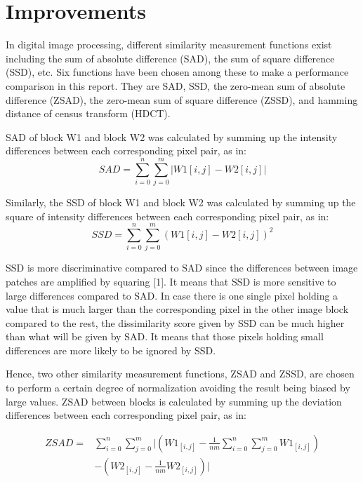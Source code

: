\documentclass[conference]{IEEEtran}
\begin{document}
\section{Improvements}
In digital image processing, different similarity measurement functions exist including the sum of absolute difference (SAD), the sum of square difference (SSD), etc. Six functions have been chosen among these to make a performance comparison in this report. They are SAD, SSD, the zero-mean sum of absolute difference (ZSAD), the zero-mean sum of square difference (ZSSD), and hamming distance of census transform (HDCT). 

SAD of block W1 and block W2 was calculated by summing up the intensity differences between each corresponding pixel pair, as in:
\begin{equation*}
    SAD=\sum^{n}_{i=0}\sum^{m}_{j=0}|W1[i,j]-W2[i,j]|
\end{equation*}

Similarly, the SSD of block W1 and block W2 was calculated by summing up the square of intensity differences between each corresponding pixel pair, as in:
\begin{equation*}
    SSD=\sum^{n}_{i=0}\sum^{m}_{j=0}(W1[i,j]-W2[i,j])^2
\end{equation*}

SSD is more discriminative compared to SAD since the differences between image patches are amplified by squaring [1]. It means that SSD is more sensitive to large differences compared to SAD. In case there is one single pixel holding a value that is much larger than the corresponding pixel in the other image block compared to the rest, the dissimilarity score given by SSD can be much higher than what will be given by SAD. It means that those pixels holding small differences are more likely to be ignored by SSD.

Hence, two other similarity measurement functions, ZSAD and ZSSD, are chosen to perform a certain degree of normalization avoiding the result being biased by large values. ZSAD between blocks is calculated by summing up the deviation differences between each corresponding pixel pair, as in:

\begin{equation*}
    \begin{aligned}
        ZSAD= {} & \sum^{n}_{i=0}\sum^{m}_{j=0}|(W1_{[i,j]}-\frac{1}{nm}\sum^{n}_{i=0}\sum^{m}_{j=0}W1_{[i,j]})\\
        & -(W2_{[i,j]}-\frac{1}{nm}W2_{[i,j]})|
    \end{aligned}
\end{equation*}
\end{document}
